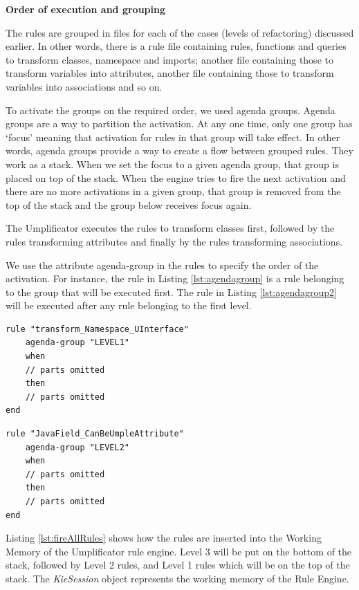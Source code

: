 \textbf{Order of execution and grouping}

The rules are grouped in files for each of the cases (levels of refactoring) discussed earlier. In other words, there is a rule file containing rules, functions and queries to transform classes, namespace and imports; another file containing those to transform variables into attributes, another file containing those to transform variables into associations and so on.

To activate the groups on the required order, we used agenda groups. Agenda groups are a way to partition the activation. At any one time, only one group has `focus' meaning that activation for rules in that group will take effect. 
In other words, agenda groups provide a way to create a flow between grouped rules. They work as a stack. When we set the focus to a given agenda group, that group is placed on top of the stack. When the engine tries to fire the next activation and there are no more activations in a given group, that group is removed from the top of the stack and the group below receives focus again.

The Umplificator executes the rules to transform classes first, followed by the rules transforming attributes and finally by the rules transforming associations. 

We use the attribute agenda-group in the rules to specify the order of the activation. For instance, the rule in Listing \ref{lst:agendagroup} is a rule belonging to the group that will be executed first. The rule in Listing \ref{lst:agendagroup2} will be executed after any rule belonging to the first level. 

\begin{lstlisting}[language={drools},label={lst:agendagroup}, caption=A rule belonging to Level 1] 
rule "transform_Namespace_UInterface"
	agenda-group "LEVEL1" 
	when
	// parts omitted
	then
	// parts omitted
end
\end{lstlisting}

\begin{lstlisting}[language={drools},label={lst:agendagroup2}, caption=A rule belonging to Level 2] 
rule "JavaField_CanBeUmpleAttribute"
	agenda-group "LEVEL2" 
	when
	// parts omitted
	then
	// parts omitted
end
\end{lstlisting}

Listing \ref{lst:fireAllRules} shows how the rules are inserted into the Working Memory of the Umplificator rule engine. Level 3 will be put on the bottom of the stack, followed by Level 2 rules, and Level 1 rules which will be on the top of the stack. The \textit{KieSession} object represents the working memory of the Rule Engine.

